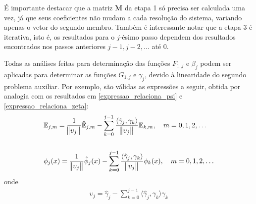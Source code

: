 É importante destacar que a matriz $\mathbf{M}$ da etapa 1 só precisa ser calculada uma vez, já que seus coeficientes não mudam a cada resolução do sistema, variando apenas o vetor do segundo membro. Também é interessante notar que a etapa 3 é iterativa, isto é, os resultados para o $j$-ésimo passo dependem dos resultados encontrados nos passos anteriores $j - 1, j - 2, \ldots$ até 0.

Todas as análises feitas para determinação das funções $F_{1,j}$ e $\beta_j$ podem ser aplicadas para determinar as funções $G_{1,j}$ e $\gamma_j$, devido à linearidade do segundo problema auxiliar. Por exemplo, são válidas as expressões a seguir, obtida por analogia com os resultados em \eqref{expressao_relaciona_psi} e \eqref{expressao_relaciona_zeta}:
\begin{align}
& \mathbb{E}_{j,m} = \frac{1}{\norm{\upsilon_j}} \hat{\mathbb{E}}_{j,m} - \sum_{k=0}^{j-1} \frac{\langle \hat{\gamma}_j, \gamma_k \rangle}{\norm{\upsilon_j}} \mathbb{E}_{k,m}, \quad m=0,1,2,\ldots \label{expressao_relaciona_omega} \\ \nonumber \\
& \phi_j(x) = \frac{1}{\norm{\upsilon_j}} \hat{\phi}_j(x) - \sum_{k=0}^{j-1} \frac{\langle \hat{\gamma}_j, \gamma_k \rangle}{\norm{\upsilon_j}} \phi_k(x), \quad m=0,1,2,\ldots \label{expressao_relaciona_phi_2}
\end{align}
onde
\begin{align}
\upsilon_j = \hat{\gamma}_j - \displaystyle\sum_{k = 0}^{j - 1} \langle \hat{\gamma}_j, \gamma_k\rangle\gamma_k
\end{align}

